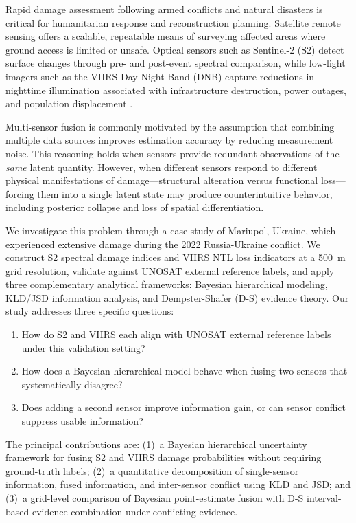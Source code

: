 \documentclass[wcp]{jmlr}
\begin{document}
Rapid damage assessment following armed conflicts and natural disasters is
critical for humanitarian response and reconstruction planning. Satellite
remote sensing offers a scalable, repeatable means of surveying affected
areas where ground access is limited or unsafe. Optical sensors such as
Sentinel-2 (S2) detect surface changes through pre- and post-event spectral
comparison, while low-light imagers such as the VIIRS Day-Night Band (DNB)
capture reductions in nighttime illumination associated with infrastructure
destruction, power outages, and population displacement
\cite{zhang2023,xiao2024}.

Multi-sensor fusion is commonly motivated by the assumption that combining
multiple data sources improves estimation accuracy by reducing measurement
noise. This reasoning holds when sensors provide redundant observations of
the \emph{same} latent quantity. However, when different sensors respond to
different physical manifestations of damage---structural alteration versus
functional loss---forcing them into a single latent state may produce
counterintuitive behavior, including posterior collapse and loss of spatial
differentiation.

We investigate this problem through a case study of Mariupol, Ukraine,
which experienced extensive damage during the 2022 Russia-Ukraine conflict.
We construct S2 spectral damage indices and VIIRS NTL loss indicators at a
500~m grid resolution, validate against UNOSAT external reference labels,
and apply three complementary analytical frameworks: Bayesian hierarchical
modeling, KLD/JSD information analysis, and Dempster-Shafer (D-S) evidence
theory. Our study addresses three specific questions:

\begin{enumerate}
  \item How do S2 and VIIRS each align with UNOSAT external reference
    labels under this validation setting?
  \item How does a Bayesian hierarchical model behave when fusing two
    sensors that systematically disagree?
  \item Does adding a second sensor improve information gain, or can
    sensor conflict suppress usable information?
\end{enumerate}

The principal contributions are: (1)~a Bayesian hierarchical uncertainty
framework for fusing S2 and VIIRS damage probabilities without requiring
ground-truth labels; (2)~a quantitative decomposition of single-sensor
information, fused information, and inter-sensor conflict using KLD and
JSD; and (3)~a grid-level comparison of Bayesian point-estimate fusion with
D-S interval-based evidence combination under conflicting evidence.
\end{document}
